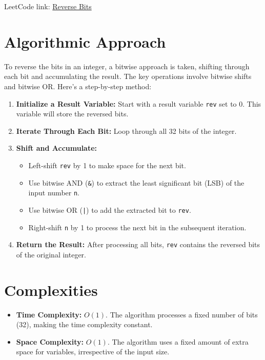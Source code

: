 LeetCode link: \href{https://leetcode.com/problems/reverse-bits/}{Reverse Bits}

\section*{Algorithmic Approach}

To reverse the bits in an integer, a bitwise approach is taken, shifting through each bit and accumulating the result. The key operations involve bitwise shifts and bitwise OR. Here's a step-by-step method:

\begin{enumerate}
    \item \textbf{Initialize a Result Variable:} Start with a result variable \texttt{rev} set to 0. This variable will store the reversed bits.
    
    \item \textbf{Iterate Through Each Bit:} Loop through all 32 bits of the integer.
    
    \item \textbf{Shift and Accumulate:}
    \begin{itemize}
        \item Left-shift \texttt{rev} by 1 to make space for the next bit.
        \item Use bitwise AND (\texttt{\&}) to extract the least significant bit (LSB) of the input number \texttt{n}.
        \item Use bitwise OR (\texttt{|}) to add the extracted bit to \texttt{rev}.
        \item Right-shift \texttt{n} by 1 to process the next bit in the subsequent iteration.
    \end{itemize}
    
    \item \textbf{Return the Result:} After processing all bits, \texttt{rev} contains the reversed bits of the original integer.
\end{enumerate}


\section*{Complexities}

\begin{itemize}
    \item \textbf{Time Complexity:} \(O(1)\). The algorithm processes a fixed number of bits (32), making the time complexity constant.
    
    \item \textbf{Space Complexity:} \(O(1)\). The algorithm uses a fixed amount of extra space for variables, irrespective of the input size.
\end{itemize}


